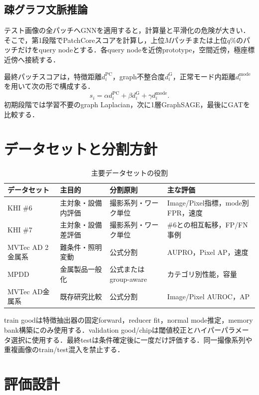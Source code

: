 \documentclass[a4paper,11pt]{ltjsarticle}
\begin{document}
\subsection{疎グラフ文脈推論}
テスト画像の全パッチへGNNを適用すると，計算量と平滑化の危険が大きい．そこで，第1段階でPatchCoreスコアを計算し，上位$M$パッチまたは上位$q\%$のパッチだけをquery nodeとする．各query nodeを近傍prototype，空間近傍，極座標近傍へ接続する．

最終パッチスコアは，特徴距離$d_i^{\mathrm{PC}}$，graph不整合度$d_i^{\mathrm{G}}$，正常モード内距離$d_i^{\mathrm{mode}}$を用いて次の形で構成する．
\begin{equation}
s_i=\alpha d_i^{\mathrm{PC}}+\beta d_i^{\mathrm{G}}+\gamma d_i^{\mathrm{mode}}.
\end{equation}
初期段階では学習不要のgraph Laplacian，次に1層GraphSAGE，最後にGATを比較する．

\section{データセットと分割方針}
\begin{table}[H]
\centering
\caption{主要データセットの役割}
\begin{tabularx}{\linewidth}{L{34mm}C{26mm}Y Y}
\toprule
データセット & 主目的 & 分割原則 & 主な評価 \\
\midrule
KHI \#6 & 主対象・設備内評価 & 撮影系列・ワーク単位 & Image/Pixel指標，mode別FPR，速度 \\
KHI \#7 & 主対象・設備差評価 & 撮影系列・ワーク単位 & \#6との相互転移，FP/FN事例 \\
MVTec AD 2金属系 & 難条件・照明変動 & 公式分割 & AUPRO，Pixel AP，速度 \\
MPDD & 金属製品一般化 & 公式またはgroup-aware & カテゴリ別性能，容量 \\
MVTec AD金属系 & 既存研究比較 & 公式分割 & Image/Pixel AUROC，AP \\
\bottomrule
\end{tabularx}
\end{table}

train goodは特徴抽出器の固定forward，reducer fit，normal mode推定，memory bank構築にのみ使用する．validation good/chipは閾値校正とハイパーパラメータ選択に使用する．最終testは条件確定後に一度だけ評価する．同一撮像系列や重複画像のtrain/test混入を禁止する．

\section{評価設計}
\end{document}
